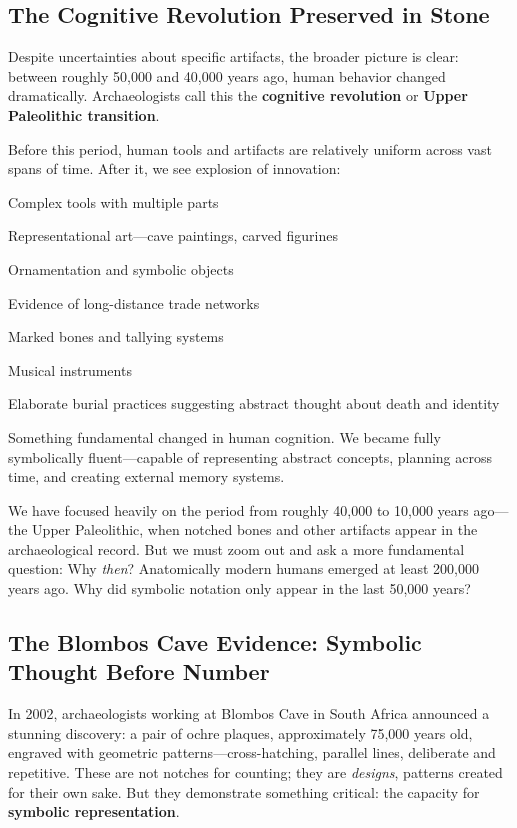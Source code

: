 \subsection{The Cognitive Revolution Preserved in Stone}

Despite uncertainties about specific artifacts, the broader picture is clear: between roughly 50,000 and 40,000 years ago, human behavior changed dramatically. Archaeologists call this the \textbf{cognitive revolution} or \textbf{Upper Paleolithic transition}.

Before this period, human tools and artifacts are relatively uniform across vast spans of time. After it, we see explosion of innovation:
\begin{compactitem}
	\item Complex tools with multiple parts
	\item Representational art—cave paintings, carved figurines
	\item Ornamentation and symbolic objects
	\item Evidence of long-distance trade networks
	\item Marked bones and tallying systems
	\item Musical instruments
	\item Elaborate burial practices suggesting abstract thought about death and identity
\end{compactitem}

Something fundamental changed in human cognition. We became fully symbolically fluent—capable of representing abstract concepts, planning across time, and creating external memory systems.

We have focused heavily on the period from roughly 40,000 to 10,000 years ago---the Upper Paleolithic, when notched bones and other artifacts appear in the archaeological record. But we must zoom out and ask a more fundamental question: Why \textit{then}? Anatomically modern humans emerged at least 200,000 years ago. Why did symbolic notation only appear in the last 50,000 years?

\subsection{The Blombos Cave Evidence: Symbolic Thought Before Number}

In 2002, archaeologists working at Blombos Cave in South Africa announced a stunning discovery: a pair of ochre plaques, approximately 75,000 years old, engraved with geometric patterns---cross-hatching, parallel lines, deliberate and repetitive. These are not notches for counting; they are \textit{designs}, patterns created for their own sake. But they demonstrate something critical: the capacity for \textbf{symbolic representation}.

